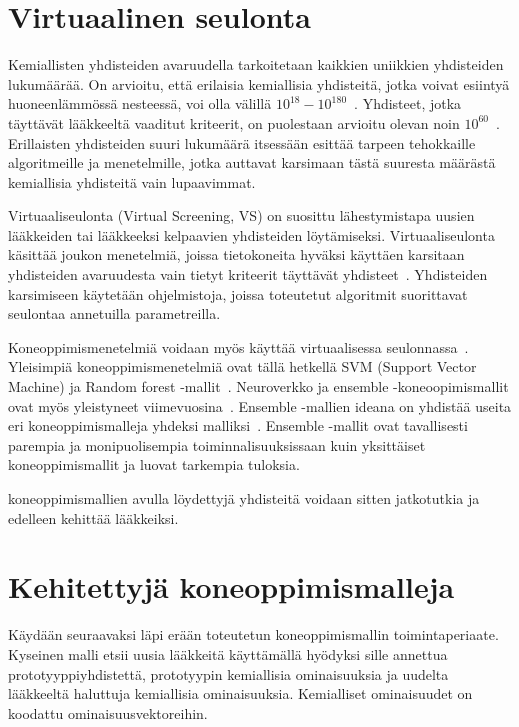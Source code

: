 \documentclass[finnish,twoside,censored,tkt,sw-line]{HYthesisML}
\begin{document}
\section{Virtuaalinen seulonta}

Kemiallisten yhdisteiden avaruudella tarkoitetaan kaikkien uniikkien yhdisteiden lukumäärää.
On arvioitu, että erilaisia kemiallisia yhdisteitä, jotka voivat esiintyä huoneenlämmössä nesteessä, voi olla välillä \(10^{18} - 10^{180}\)~\cite{SotrifferChristoph2011VSPC}.
Yhdisteet, jotka täyttävät lääkkeeltä vaaditut kriteerit, on puolestaan arvioitu olevan noin \(10^{60}\)~\cite{SotrifferChristoph2011VSPC}.
Erillaisten yhdisteiden suuri lukumäärä itsessään esittää tarpeen tehokkaille algoritmeille ja menetelmille, jotka auttavat karsimaan tästä suuresta määrästä kemiallisia yhdisteitä vain lupaavimmat.

Virtuaaliseulonta (Virtual Screening, VS) on suosittu lähestymistapa uusien lääkkeiden tai lääkkeeksi kelpaavien yhdisteiden löytämiseksi.
Virtuaaliseulonta käsittää joukon menetelmiä, joissa tietokoneita hyväksi käyttäen karsitaan yhdisteiden avaruudesta vain tietyt kriteerit täyttävät yhdisteet~\cite{SotrifferChristoph2011VSPC}.
Yhdisteiden karsimiseen käytetään ohjelmistoja, joissa toteutetut algoritmit suorittavat seulontaa annetuilla parametreilla.

Koneoppimismenetelmiä voidaan myös käyttää virtuaalisessa seulonnassa~\cite{SotrifferChristoph2011VSPC}.
Yleisimpiä koneoppimismenetelmiä ovat tällä hetkellä SVM (Support Vector Machine) ja Random forest -mallit~\cite{SotrifferChristoph2011VSPC}.
Neuroverkko ja ensemble -koneoopimismallit ovat myös yleistyneet viimevuosina~\cite{ShinBonggun,PopovaMariya2018Drlf}.
Ensemble -mallien ideana on yhdistää useita eri koneoppimismalleja yhdeksi malliksi~\cite{RokachLior2009Ec}.
Ensemble -mallit ovat tavallisesti parempia ja monipuolisempia toiminnalisuuksissaan kuin yksittäiset koneoppimismallit ja luovat tarkempia tuloksia.

koneoppimismallien avulla löydettyjä yhdisteitä voidaan sitten jatkotutkia ja edelleen kehittää lääkkeiksi.

\section{Kehitettyjä koneoppimismalleja}
Käydään seuraavaksi läpi erään toteutetun koneoppimismallin toimintaperiaate.
Kyseinen malli etsii uusia lääkkeitä käyttämällä hyödyksi sille annettua prototyyppiyhdistettä, prototyypin kemiallisia ominaisuuksia ja uudelta lääkkeeltä haluttuja kemiallisia ominaisuuksia.
Kemialliset ominaisuudet on koodattu ominaisuusvektoreihin.
\end{document}
